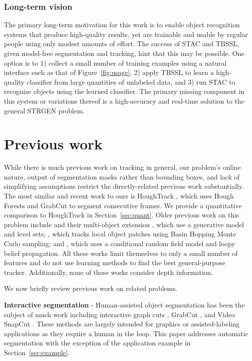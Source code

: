 \documentclass[journal]{IEEEtran}
\begin{document}
\subsubsection{Long-term vision}

The primary long-term motivation for this work is to enable object recognition systems that produce high-quality results, yet are trainable and usable by regular people using only modest amounts of effort. The success of STAC and TBSSL, given model-free segmentation and tracking, hint that this may be possible.  One option is to 1) collect a small number of training examples using a natural interface such as that of Figure~\ref{fig:usage}, 2) apply TBSSL to learn a high-quality classifier from large quantities of unlabeled data, and 3) run STAC to recognize objects using the learned classifier.  The primary missing component in this system or variations thereof is a high-accuracy and real-time solution to the general STRGEN problem.

\section{Previous work}
\label{sec:prev_work}

While there is much previous work on tracking in general, our problem's online nature, output of segmentation masks rather than bounding boxes, and lack of simplifying assumptions restrict the directly-related previous work substantially.  The most similar and recent work to ours is HoughTrack \cite{godec2011a}, which uses Hough Forests and GrabCut to segment consecutive frames.  We provide a quantitative comparison to HoughTrack in Section~\ref{sec:quant}.  Older previous work on this problem include \cite{bibby2008a} and their multi-object extension \cite{bibby2010a}, which use a generative model and level sets; \cite{kwon2009a}, which tracks local object patches using Basin Hopping Monte Carlo sampling; and \cite{ren2007a}, which uses a conditional random field model and loopy belief propagation. All these works limit themselves to only a small number of features and do not use learning methods to find the best general-purpose tracker.  Additionally, none of these works consider depth information.

We now briefly review previous work on related problems.

\textbf{Interactive segmentation} - Human-assisted object segmentation has been the subject of much work including interactive graph cuts \cite{boykov2001a}, GrabCut \cite{rother2004a}, and Video SnapCut \cite{bai2009a}.  These methods are largely intended for graphics or assisted-labeling applications as they require a human in the loop.  This paper addresses automatic segmentation with the exception of the application example in Section~\ref{sec:example}.
\end{document}
